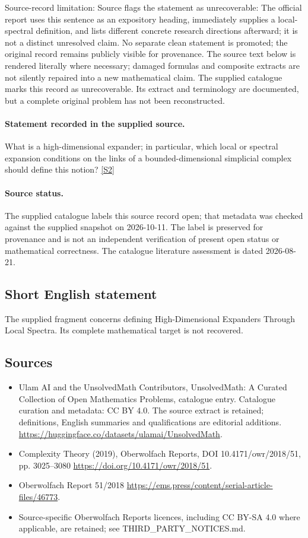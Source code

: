 \documentclass[11pt]{article}
\begin{document}
Source-record limitation: Source flags the statement as unrecoverable: The official report uses this sentence as an expository heading, immediately supplies a local-spectral definition, and lists different concrete research directions afterward; it is not a distinct unresolved claim. No separate clean statement is promoted; the original record remains publicly visible for provenance.
The source text below is rendered literally where necessary; damaged formulas and composite extracts are not silently repaired into a new mathematical claim.
The supplied catalogue marks this record as unrecoverable. Its extract and terminology are documented, but a complete original problem has not been reconstructed.
\paragraph{Statement recorded in the supplied source.}
What is a high-dimensional expander; in particular, which local or spectral expansion conditions on the links of a bounded-dimensional simplicial complex should define this notion? \href{https://doi.org/10.4171/owr/2018/51}{[S2]}
\paragraph{Source status.}
The supplied catalogue labels this source record open; that metadata was checked against the supplied snapshot on 2026-10-11. The label is preserved for provenance and is not an independent verification of present open status or mathematical correctness. The catalogue literature assessment is dated 2026-08-21.
\subsection{Short English statement}
The supplied fragment concerns defining High-Dimensional Expanders Through Local Spectra. Its complete mathematical target is not recovered.
\subsection{Sources}
\begin{itemize}
\item[S1] Ulam AI and the UnsolvedMath Contributors, UnsolvedMath: A Curated Collection of Open Mathematics Problems, catalogue entry. Catalogue curation and metadata: CC BY 4.0. The source extract is retained; definitions, English summaries and qualifications are editorial additions.
\url{https://huggingface.co/datasets/ulamai/UnsolvedMath}.
\item[S2] Complexity Theory (2019), Oberwolfach Reports, DOI 10.4171/owr/2018/51, pp. 3025--3080
\url{https://doi.org/10.4171/owr/2018/51}.
\item[S3] Oberwolfach Report 51/2018
\url{https://ems.press/content/serial-article-files/46773}.
\item Source-specific Oberwolfach Reports licences, including CC BY-SA 4.0 where applicable, are retained; see THIRD\_PARTY\_NOTICES.md.
\end{itemize}
\end{document}
